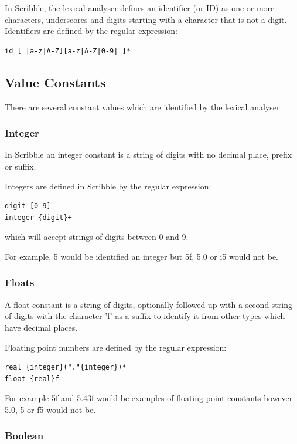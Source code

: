 \documentclass[]{final_report}
\begin{document}
In Scribble, the lexical analyser defines an identifier (or ID) as one or more characters, underscores and digits starting with a character that is not a digit. Identifiers are defined by the regular expression:
\begin{verbatim}
id [_|a-z|A-Z][a-z|A-Z|0-9|_]*
\end{verbatim}

\subsection{Value Constants}

There are several constant values which are identified by the lexical analyser.

\subsubsection{Integer}

In Scribble an integer constant is a string of digits with no decimal place, prefix or suffix. 

Integers are defined in Scribble by the regular expression:
\begin{verbatim}
digit [0-9]
integer {digit}+
\end{verbatim}

which will accept strings of digits between 0 and 9.

For example, 5 would be identified an integer but 5f, 5.0 or i5 would not be.

\subsubsection{Floats}

A float constant is a string of digits, optionally followed up with a second string of digits with the character 'f' as a suffix to identify it from other types which have decimal places. 

Floating point numbers are defined by the regular expression:
\begin{verbatim}
real {integer}("."{integer})*
float {real}f
\end{verbatim}

For example 5f and 5.43f would be examples of floating point constants however 5.0, 5 or f5 would not be.

\subsubsection{Boolean}
\end{document}
